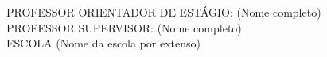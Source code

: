 \noindent
\begin{center}
    \centering    
    PROFESSOR ORIENTADOR DE ESTÁGIO: (Nome completo)\\
    \vspace*{\fill}
    PROFESSOR SUPERVISOR: (Nome completo)\\
    \vfill
    ESCOLA (Nome da escola por extenso)
\end{center}
\pagebreak